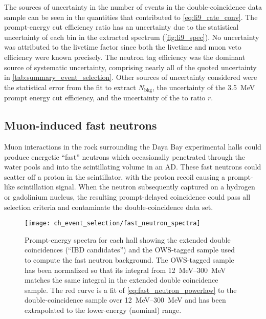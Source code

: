 The sources of uncertainty in the number of \li{} events
in the double-coincidence data sample
can be seen in the quantities that contributed to \cref{eq:li9_rate_conv}.
The prompt-energy cut efficiency ratio has an uncertainty
due to the statistical uncertainty of each bin in the extracted \li{} spectrum
(\cref{fig:li9_spec}).
No uncertainty was attributed to the livetime factor since
both the livetime and muon veto efficiency were known precisely.
The neutron tag efficiency
was the dominant source of systematic uncertainty,
comprising nearly all of the quoted uncertainty in \cref{tab:summary_event_selection}.
Other sources of uncertainty considered were
the statistical error from the fit to extract $N_\text{bkg}$,
the uncertainty of the \SI{3.5}{\MeV} prompt energy cut efficiency,
and the uncertainty of the \li{} to \he{} ratio $r$.

\subsection{Muon-induced fast neutrons}
\label{subsec:fastn}

Muon interactions in the rock surrounding the Daya Bay experimental halls
could produce energetic ``fast'' neutrons
which occasionally penetrated through the water pools
and into the scintillating volume in an AD.
These fast neutrons could scatter off a proton in the scintillator,
with the proton recoil causing a prompt-like scintillation signal.
When the neutron subsequently captured on a hydrogen or gadolinium nucleus,
the resulting prompt-delayed coincidence
could pass all selection criteria and contaminate the double-coincidence data set.

\begin{figure}
    \centering
    \texttt{[image: ch\_event\_selection/fast\_neutron\_spectra]}
    \caption[Fast neutron spectrum]{
        Prompt-energy spectra for each hall
        showing the extended double coincidences (``IBD candidates'')
        and the OWS-tagged sample used to compute the fast neutron background.
        The OWS-tagged sample has been normalized
        so that its integral from \SIrange{12}{300}{\MeV}
        matches the same integral in the extended double coincidence sample.
        The red curve is a fit of \cref{eq:fast_neutron_powerlaw}
        to the double-coincidence sample over \SIrange{12}{300}{\MeV}
        and has been extrapolated to the lower-energy (nominal) range.
    }
    \label{fig:fast_neutron}
\end{figure}

